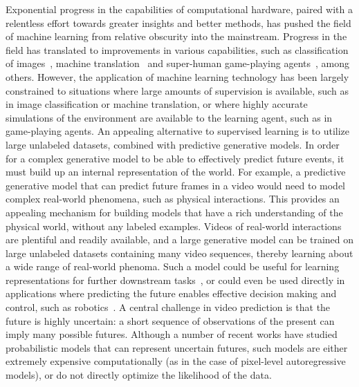 \documentclass{article} \usepackage{iclr2020_conference,times}
\begin{document}
Exponential progress in the capabilities of computational hardware, paired with a relentless effort towards greater insights and better methods, has pushed the field of machine learning from relative obscurity into the mainstream. Progress in the field has translated to improvements in various capabilities, such as classification of images~\citep{krizhevsky2012imagenet}, machine translation~\citep{vaswani2017attention} and super-human game-playing agents~\citep{mnih2013playing,silver2017mastering}, among others. However, the application of machine learning technology has been largely constrained to situations where large amounts of supervision is available, such as in image classification or machine translation, or where highly accurate simulations of the environment are available to the learning agent, such as in game-playing agents. An appealing alternative to supervised learning is to utilize large unlabeled datasets, combined with predictive generative models. In order for a complex generative model to be able to effectively predict future events, it must build up an internal representation of the world. For example, a predictive generative model that can predict future frames in a video would need to model complex real-world phenomena, such as physical interactions. This provides an appealing mechanism for building models that have a rich understanding of the physical world, without any labeled examples. Videos of real-world interactions are plentiful and readily available, and a large generative model can be trained on large unlabeled datasets containing many video sequences, thereby learning about a wide range of real-world phenoma. Such a model could be useful for learning representations for further downstream tasks~\citep{mathieu2015deep}, or could even be used directly in applications where predicting the future enables effective decision making and control, such as robotics~\citep{finn2016unsupervised}. A central challenge in video prediction is that the future is highly uncertain: a short sequence of observations of the present can imply many possible futures. Although a number of recent works have studied probabilistic models that can represent uncertain futures, such models are either extremely expensive computationally (as in the case of pixel-level autoregressive models), or do not directly optimize the likelihood of the data.
\end{document}

